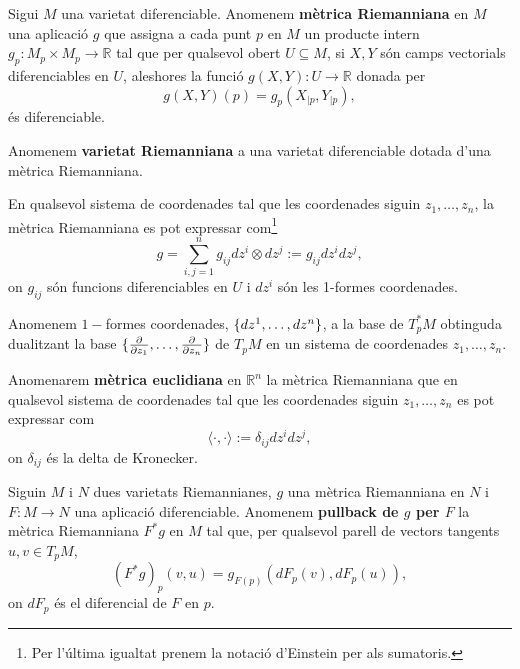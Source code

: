\begin{defi}
    Sigui $M$ una varietat diferenciable. Anomenem \textbf{mètrica Riemanniana} en $M$ una aplicació $g$ que assigna a cada punt $p$ en $M$ un producte intern $g_p:M_p\times M_p\to\mathbb R$ tal que per qualsevol obert $U\subseteq M$, si $X,Y$ són camps vectorials diferenciables en $U$, aleshores la funció $g(X,Y):U\to\mathbb R$ donada per
    \begin{equation*}
        g(X,Y)(p) = g_p(X_{|p},Y_{|p}),
    \end{equation*}
    és diferenciable.
    
    Anomenem \textbf{varietat Riemanniana} a una varietat diferenciable dotada d'una mètrica Riemanniana.
\end{defi}
En qualsevol sistema de coordenades tal que les coordenades siguin $z_1,\dots,z_n$, la mètrica Riemanniana es pot expressar com\footnote{Per l'última igualtat prenem la notació d'Einstein per als sumatoris.}
\begin{equation*}
    g = \sum_{i,j=1}^n g_{ij}dz^i\otimes dz^j := g_{ij}dz^idz^j,
\end{equation*}
on $g_{ij}$ són funcions diferenciables en $U$ i $dz^i$ són les 1-formes coordenades.

\begin{defi}
    Anomenem $1-$formes coordenades, $\{dz^1,\dots,dz^n\}$, a la base de $T_p^*M$ obtinguda dualitzant la base $\{\frac{\partial}{\partial z_1},\dots,\frac{\partial}{\partial z_n}\}$ de $T_pM$ en un sistema de coordenades $z_1,\dots,z_n$.
\end{defi}

\begin{defi}
    Anomenarem \textbf{mètrica euclidiana} en $\mathbb R^n$ la mètrica Riemanniana que en qualsevol sistema de coordenades tal que les coordenades siguin $z_1,\dots,z_n$ es pot expressar com
    \begin{equation*}
        \langle\cdot,\cdot\rangle := \delta_{ij}dz^idz^j,
    \end{equation*}
    on $\delta_{ij}$ és la delta de Kronecker.
\end{defi}

\begin{defi}\label{def:pullback_metric}
    Siguin $M$ i $N$ dues varietats Riemannianes, $g$ una mètrica Riemanniana en $N$ i $F:M\to N$ una aplicació diferenciable. Anomenem \textbf{pullback de $g$ per $F$} la mètrica Riemanniana $F^*g$ en $M$ tal que, per qualsevol parell de vectors tangents $u,v\in T_pM$,
    \begin{equation*}
        (F^*g)_p(v,u) = g_{F(p)}(dF_p(v),dF_p(u)),
    \end{equation*}
    on $dF_p$ és el diferencial de $F$ en $p$.
\end{defi}

